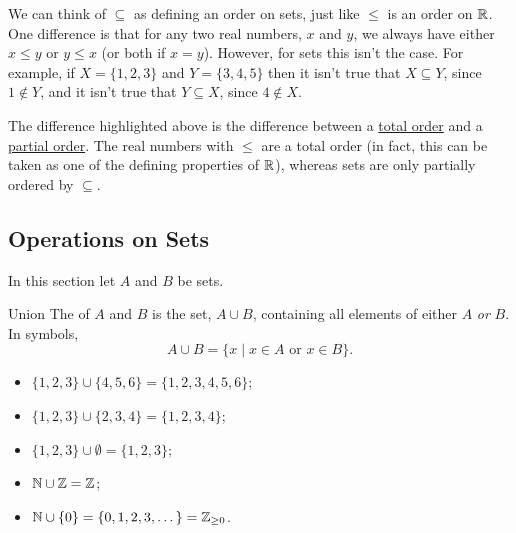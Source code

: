\documentclass[fleqn]{LectureClass/LectureClass}
\begin{document}
    We can think of \(\subseteq\) as defining an order on sets, just like \(\le\) is an order on \(\mathbb{R}\).
    One difference is that for any two real numbers, \(x\) and \(y\), we always have either \(x \le y\) or \(y \le x\) (or both if \(x = y\)).
    However, for sets this isn't the case.
    For example, if \(X = \{1, 2, 3\}\) and \(Y = \{3, 4, 5\}\) then it isn't true that \(X \subseteq Y\), since \(1 \notin Y\), and it isn't true that \(Y \subseteq X\), since \(4 \notin X\).
    
    \begin{remark}{}{}
        The difference highlighted above is the difference between a \href{https://en.wikipedia.org/wiki/Total_order}{total order} and a \href{https://en.wikipedia.org/wiki/Partially_ordered_set}{partial order}.
        The real numbers with \(\le\) are a total order (in fact, this can be taken as one of the defining properties of \(\mathbb{R}\)), whereas sets are only partially ordered by \(\subseteq\).
    \end{remark}
    
    \subsection{Operations on Sets}
    In this section let \(A\) and \(B\) be sets.
    
    \begin{dfn}{Union}{}
        The  of \(A\) and \(B\) is the set, \(A \cup B\), containing all elements of either \(A\) \emph{or} \(B\).
        In symbols,
        \begin{equation}
            A \cup B = \{x \mid x \in A \text{ or } x \in B\}.
        \end{equation}
    \end{dfn}
    
    \begin{exm}{}{}
        \begin{itemize}
            \item \(\{1, 2, 3\} \cup \{4, 5, 6\} = \{1, 2, 3, 4, 5, 6\}\);
            \item \(\{1, 2, 3\} \cup \{2, 3, 4\} = \{1, 2, 3, 4\}\);
            \item \(\{1, 2, 3\} \cup \emptyset = \{1, 2, 3\}\);
            \item \(\mathbb{N} \cup \mathbb{Z} = \mathbb{Z}\);
            \item \(\mathbb{N} \cup \{0\} = \{0, 1, 2, 3, \dotsc\} = \mathbb{Z}_{\ge 0}\).
        \end{itemize}
    \end{exm}
    
\end{document}
